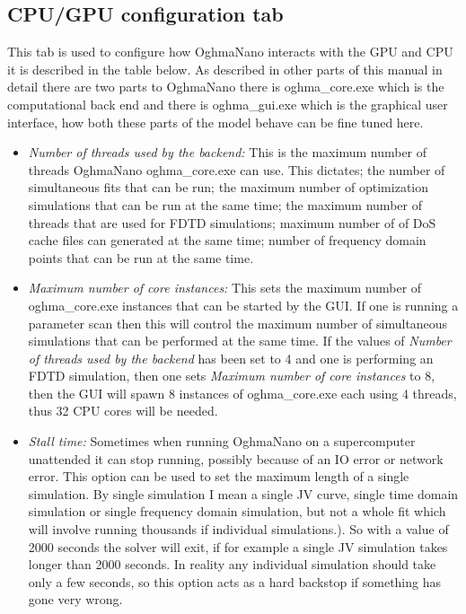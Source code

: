 \subsection{CPU/GPU configuration tab}
This tab is used to configure how OghmaNano interacts with the GPU and CPU it is described in the table below. As described in other parts of this manual in detail there are two parts to OghmaNano there is oghma\_core.exe which is the computational back end and there is oghma\_gui.exe which is the graphical user interface, how both these parts of the model behave can be fine tuned here.

	\begin{itemize}
		\vspace{-0.2cm}\item \emph{Number of threads used by the backend:} This is the maximum number of threads OghmaNano oghma\_core.exe can use. This dictates; the number of simultaneous fits that can be run; the maximum number of optimization simulations that can be run at the same time; the maximum number of threads that are used for FDTD simulations; maximum number of of DoS cache files can generated at the same time; number of frequency domain points that can be run at the same time.
		\vspace{-0.2cm}\item \emph{Maximum number of core instances:} This sets the maximum number of oghma\_core.exe instances that can be started by the GUI. If one is running a parameter scan then this will control the maximum number of simultaneous simulations that can be performed at the same time. If the values of \emph{Number of threads used by the backend} has been set to 4 and one is performing an FDTD simulation, then one sets \emph{Maximum number of core instances} to 8, then the GUI will spawn 8 instances of oghma\_core.exe each using 4 threads, thus 32 CPU cores will be needed.
		\vspace{-0.2cm}\item \emph{Stall time:} Sometimes when running OghmaNano on a supercomputer unattended it can stop running, possibly because of an IO error or network error. This option can be used to set the maximum length of a single simulation. By single simulation I mean a single JV curve, single time domain simulation or single frequency domain simulation, but not a whole fit which will involve running thousands if individual simulations.). So with a value of 2000 seconds the solver will exit, if for example a single JV simulation takes longer than 2000 seconds. In reality any individual simulation should take only a few seconds, so this option acts as a hard backstop if something has gone very wrong. 

\end{itemize}
